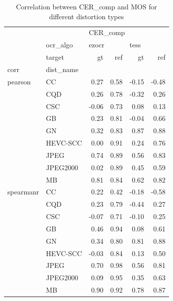 \begin{table}[h]
\centering
\begin{tabular}{llrrrr}
\toprule
          & {} & \multicolumn{4}{l}{CER\_comp} \\
          & ocr\_algo & \multicolumn{2}{l}{ezocr} & \multicolumn{2}{l}{tess} \\
          & target &       \gls{gt} &   ref &    \gls{gt} &   ref \\
corr & dist\_name &          &       &       &       \\
\midrule
pearson & CC &     0.27 &  0.58 & -0.15 & -0.48 \\
          & CQD &     0.26 &  0.78 & -0.32 &  0.26 \\
          & CSC &    -0.06 &  0.73 &  0.08 &  0.13 \\
          & GB &     0.23 &  0.81 & -0.04 &  0.66 \\
          & GN &     0.32 &  0.83 &  0.87 &  0.88 \\
          & HEVC-SCC &     0.00 &  0.91 &  0.24 &  0.76 \\
          & JPEG &     0.74 &  0.89 &  0.56 &  0.83 \\
          & JPEG2000 &     0.02 &  0.89 &  0.45 &  0.59 \\
          & MB &     0.81 &  0.84 &  0.62 &  0.82 \\
spearmanr & CC &     0.22 &  0.42 & -0.18 & -0.58 \\
          & CQD &     0.23 &  0.79 & -0.44 &  0.27 \\
          & CSC &    -0.07 &  0.71 & -0.10 &  0.25 \\
          & GB &     0.46 &  0.94 &  0.08 &  0.61 \\
          & GN &     0.34 &  0.80 &  0.81 &  0.88 \\
          & HEVC-SCC &    -0.03 &  0.84 &  0.13 &  0.50 \\
          & JPEG &     0.70 &  0.98 &  0.56 &  0.81 \\
          & JPEG2000 &     0.09 &  0.95 &  0.35 &  0.63 \\
          & MB &     0.90 &  0.92 &  0.78 &  0.87 \\
\bottomrule
\end{tabular}
\caption{Correlation between CER\_comp and MOS for different distortion types}
\label{tab:pearson_spear}
\end{table}

